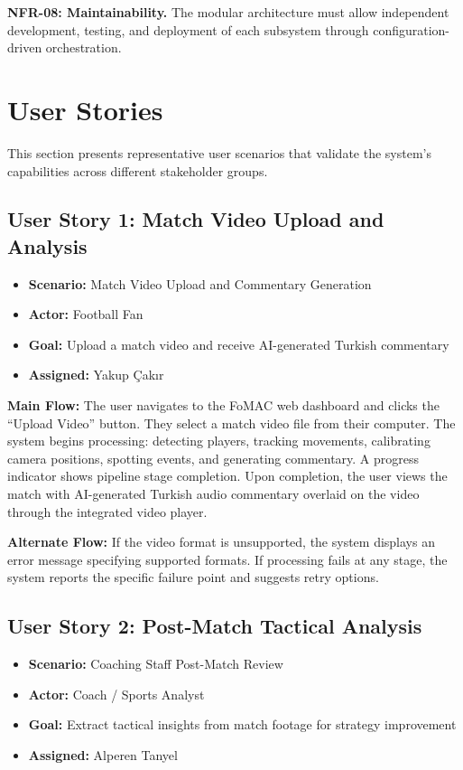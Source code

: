 \documentclass[10pt,twocolumn,a4paper]{article}
\begin{document}
\textbf{NFR-08: Maintainability.} The modular architecture must allow independent development, testing, and deployment of each subsystem through configuration-driven orchestration.

\section{User Stories}

This section presents representative user scenarios that validate the system's capabilities across different stakeholder groups.

\subsection{User Story 1: Match Video Upload and Analysis}

\begin{itemize}[noitemsep,topsep=0pt]
  \item \textbf{Scenario:} Match Video Upload and Commentary Generation
  \item \textbf{Actor:} Football Fan
  \item \textbf{Goal:} Upload a match video and receive AI-generated Turkish commentary
  \item \textbf{Assigned:} Yakup \c{C}ak{\i}r
\end{itemize}

\textbf{Main Flow:} The user navigates to the FoMAC web dashboard and clicks the ``Upload Video'' button. They select a match video file from their computer. The system begins processing: detecting players, tracking movements, calibrating camera positions, spotting events, and generating commentary. A progress indicator shows pipeline stage completion. Upon completion, the user views the match with AI-generated Turkish audio commentary overlaid on the video through the integrated video player.

\textbf{Alternate Flow:} If the video format is unsupported, the system displays an error message specifying supported formats. If processing fails at any stage, the system reports the specific failure point and suggests retry options.

\subsection{User Story 2: Post-Match Tactical Analysis}

\begin{itemize}[noitemsep,topsep=0pt]
  \item \textbf{Scenario:} Coaching Staff Post-Match Review
  \item \textbf{Actor:} Coach / Sports Analyst
  \item \textbf{Goal:} Extract tactical insights from match footage for strategy improvement
  \item \textbf{Assigned:} Alperen Tanyel
\end{itemize}
\end{document}
